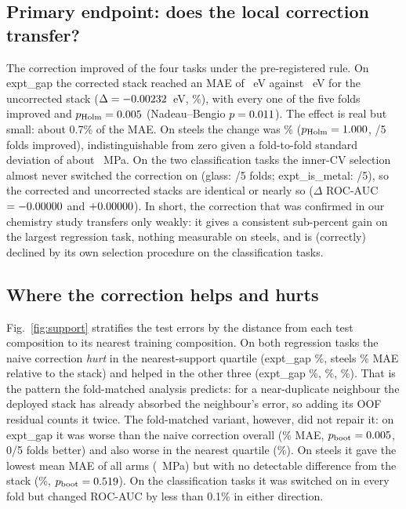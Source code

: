 \subsection{Primary endpoint: does the local correction transfer?}
The correction improved \NTasksImproved{} of the four tasks under the pre-registered rule.
On expt\_gap the corrected stack reached an MAE of \GapStackLocal{}~eV against \GapStack{}~eV for the uncorrected stack ($\Delta=-0.00232$~eV, \RelGap\%), with every one of the five folds improved and $p_\mathrm{Holm}=0.005$ (Nadeau--Bengio $p=0.011$).
The effect is real but small: about 0.7\% of the MAE.
On steels the change was \RelSteels\% ($p_\mathrm{Holm}=1.000$, \FoldsSteels{}/5 folds improved), indistinguishable from zero given a fold-to-fold standard deviation of about \SteelsStackStd~MPa.
On the two classification tasks the inner-CV selection almost never switched the correction on (glass: \GlassNaiveOn/5 folds; expt\_is\_metal: \MetalNaiveOn/5), so the corrected and uncorrected stacks are identical or nearly so ($\Delta$ ROC-AUC $=-0.00000$ and $+0.00000$).
In short, the correction that was confirmed in our chemistry study transfers only weakly: it gives a consistent sub-percent gain on the largest regression task, nothing measurable on steels, and is (correctly) declined by its own selection procedure on the classification tasks.

\subsection{Where the correction helps and hurts}
Fig.~\ref{fig:support} stratifies the test errors by the distance from each test composition to its nearest training composition.
On both regression tasks the naive correction \emph{hurt} in the nearest-support quartile (expt\_gap \GapLocalQOne\%, steels \SteelsLocalQOne\% MAE relative to the stack) and helped in the other three (expt\_gap \GapLocalQTwo\%, \GapLocalQThree\%, \GapLocalQFour\%).
That is the pattern the fold-matched analysis predicts: for a near-duplicate neighbour the deployed stack has already absorbed the neighbour's error, so adding its OOF residual counts it twice.
The fold-matched variant, however, did not repair it: on expt\_gap it was worse than the naive correction overall (\GapStackFmVsStackLocalRel\% MAE, $p_\mathrm{boot}=0.005$, 0/5 folds better) and also worse in the nearest quartile (\GapFmQOne\%).
On steels it gave the lowest mean MAE of all arms (\SteelsStackFm~MPa) but with no detectable difference from the stack (\SteelsStackFmVsStackRel\%, $p_\mathrm{boot}=0.519$).
On the classification tasks it was switched on in every fold but changed ROC-AUC by less than 0.1\% in either direction.

